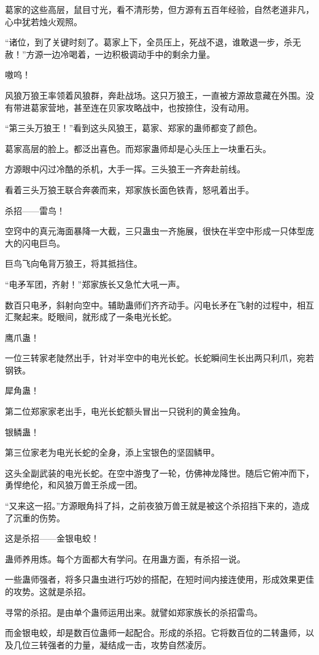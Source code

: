 \begin{this_body}
葛家的这些高层，鼠目寸光，看不清形势，但方源有五百年经验，自然老道非凡，心中犹若烛火观照。

“诸位，到了关键时刻了。葛家上下，全员压上，死战不退，谁敢退一步，杀无赦！”方源一边冷喝着，一边积极调动手中的剩余力量。

嗷呜！

风狼万狼王率领着风狼群，奔赴战场。这只万狼王，一直被方源故意藏在外围。没有带进葛家营地，甚至连在贝家攻略战中，也按捺住，没有动用。

“第三头万狼王！”看到这头风狼王，葛家、郑家的蛊师都变了颜色。

葛家高层的脸上。都泛出喜色。而郑家蛊师却是心头压上一块重石头。

方源眼中闪过冷酷的杀机，大手一挥。三头狼王一齐奔赴前线。

看着三头万狼王联合奔袭而来，郑家族长面色铁青，怒吼着出手。

杀招——雷鸟！

空窍中的真元海面暴降一大截，三只蛊虫一齐施展，很快在半空中形成一只体型庞大的闪电巨鸟。

巨鸟飞向龟背万狼王，将其抵挡住。

“电矛军团，齐射！”郑家族长又急忙大吼一声。

数百只电矛，斜射向空中。辅助蛊师们齐齐动手。闪电长矛在飞射的过程中，相互汇聚起来。眨眼间，就形成了一条电光长蛇。

鹰爪蛊！

一位三转家老陡然出手，针对半空中的电光长蛇。长蛇瞬间生长出两只利爪，宛若钢铁。

犀角蛊！

第二位郑家家老出手，电光长蛇额头冒出一只锐利的黄金独角。

银鳞蛊！

第三位家老为电光长蛇的全身，添上宝银色的坚固鳞甲。

这头全副武装的电光长蛇。在空中游曳了一轮，仿佛神龙降世。随后它俯冲而下，勇悍绝伦，和风狼万兽王杀成一团。

“又来这一招。”方源眼角抖了抖，之前夜狼万兽王就是被这个杀招挡下来的，造成了沉重的伤势。

这是杀招——金银电蛟！

蛊师养用炼。每个方面都大有学问。在用蛊方面，有杀招一说。

一些蛊师强者，将多只蛊虫进行巧妙的搭配，在短时间内接连使用，形成效果更佳的攻势。这就是杀招。

寻常的杀招。是由单个蛊师运用出来。就譬如郑家族长的杀招雷鸟。

而金银电蛟，却是数百位蛊师一起配合。形成的杀招。它将数百位的二转蛊师，以及几位三转强者的力量，凝结成一击，攻势自然凌厉。


\end{this_body}

